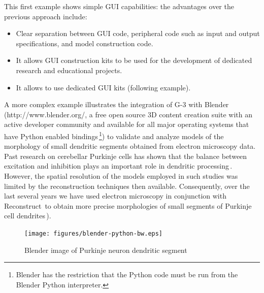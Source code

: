 \documentclass[12pt]{article}
\begin{document}

This first example shows simple GUI capabilities: the advantages over
the previous approach include:
\begin{itemize}
\item Clear separation between GUI code, peripheral
  code such as input and output specifications, and model
  construction code.
\item It allows GUI construction kits to be used for the development
  of dedicated research and educational projects.
\item It allows to use dedicated GUI kits (following example).
\end{itemize}

A more complex example illustrates the integration of G-3 with Blender
(http://www.blender.org/, a free open source 3D content creation suite
with an active developer community and available for all major
operating systems that have Python enabled bindings\,\footnote{Blender
  has the restriction that the Python code must be run from the
  Blender Python interpreter.}) to validate and analyze models of the
morphology of small dendritic segments obtained from electron
microscopy data. Past research on cerebellar Purkinje cells has shown
that the balance between excitation and inhibition plays an important
role in dendritic processing\,\cite{santamaria02:_modul_purkin,
  mittmann07:_linkin_purkin}.  However, the spatial resolution of the
models employed in such studies was limited by the reconstruction
techniques then available.  Consequently, over the last several years
we have used electron microscopy in conjunction with
Reconstruct\,\cite{jc05:_recon}
to obtain more precise morphologies of small segments of Purkinje cell
dendrites\,\cite{lu09:_d_purkin, cornelis08:_model_neuros_genes}).

\begin{figure}[ht]
  \centering
    \texttt{[image: figures/blender-python-bw.eps]}
  \caption{Blender image of Purkinje neuron dendritic segment}
  \label{fig:cbi-blender}
\end{figure}

\end{document}
